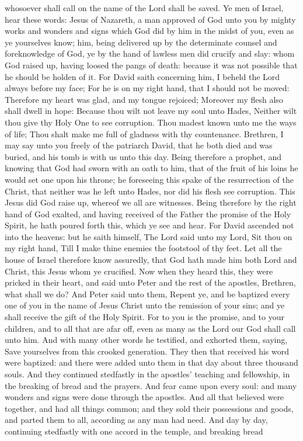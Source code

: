 whosoever shall call on the name of the Lord shall be saved.  Ye men of Israel, hear these words: Jesus of Nazareth, a man approved of God unto you by mighty works and wonders and signs which God did by him in the midst of you, even as ye yourselves know; him, being delivered up by the determinate counsel and foreknowledge of God, ye by the hand of lawless men did crucify and slay: whom God raised up, having loosed the pangs of death: because it was not possible that he should be holden of it. For David saith concerning him, I beheld the Lord always before my face; For he is on my right hand, that I should not be moved:  Therefore my heart was glad, and my tongue rejoiced; Moreover my flesh also shall dwell in hope:  Because thou wilt not leave my soul unto Hades, Neither wilt thou give thy Holy One to see corruption.  Thou madest known unto me the ways of life; Thou shalt make me full of gladness with thy countenance.  Brethren, I may say unto you freely of the patriarch David, that he both died and was buried, and his tomb is with us unto this day. Being therefore a prophet, and knowing that God had sworn with an oath to him, that of the fruit of his loins he would set one upon his throne; he foreseeing this spake of the resurrection of the Christ, that neither was he left unto Hades, nor did his flesh see corruption. This Jesus did God raise up, whereof we all are witnesses. Being therefore by the right hand of God exalted, and having received of the Father the promise of the Holy Spirit, he hath poured forth this, which ye see and hear. For David ascended not into the heavens: but he saith himself, The Lord said unto my Lord, Sit thou on my right hand,  Till I make thine enemies the footstool of thy feet.  Let all the house of Israel therefore know assuredly, that God hath made him both Lord and Christ, this Jesus whom ye crucified.  Now when they heard this, they were pricked in their heart, and said unto Peter and the rest of the apostles, Brethren, what shall we do? And Peter said unto them, Repent ye, and be baptized every one of you in the name of Jesus Christ unto the remission of your sins; and ye shall receive the gift of the Holy Spirit. For to you is the promise, and to your children, and to all that are afar off, even as many as the Lord our God shall call unto him. And with many other words he testified, and exhorted them, saying, Save yourselves from this crooked generation. They then that received his word were baptized: and there were added unto them in that day about three thousand souls. And they continued stedfastly in the apostles’ teaching and fellowship, in the breaking of bread and the prayers.  And fear came upon every soul: and many wonders and signs were done through the apostles. And all that believed were together, and had all things common; and they sold their possessions and goods, and parted them to all, according as any man had need. And day by day, continuing stedfastly with one accord in the temple, and breaking bread 